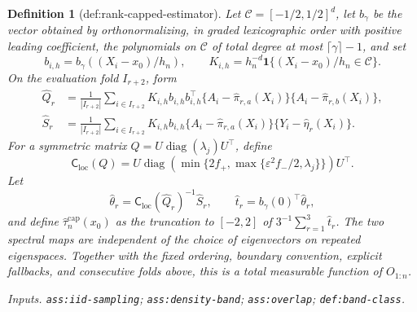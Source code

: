 \documentclass{article}
\newtheorem{definition}{Definition}
\begin{document}
\begin{definition}[def:rank-capped-estimator]
Let \(\mathcal C=[-1/2,1/2]^d\), let \(b_\gamma\) be the vector obtained by
orthonormalizing, in graded lexicographic order with positive leading
coefficient, the polynomials on \(\mathcal C\) of total degree at most
\(\lceil\gamma\rceil-1\), and set
\[
b_{i,h}=b_\gamma((X_i-x_0)/h_n),\qquad
K_{i,h}=h_n^{-d}\mathbf1\{(X_i-x_0)/h_n\in\mathcal C\}.
\]
On the evaluation fold \(I_{r+2}\), form
\[
\begin{aligned}
\widehat Q_r&=\frac1{|I_{r+2}|}\sum_{i\in I_{r+2}}
K_{i,h}b_{i,h}b_{i,h}^\top
\{A_i-\widehat\pi_{r,a}(X_i)\}
\{A_i-\widehat\pi_{r,b}(X_i)\},\\
\widehat S_r&=\frac1{|I_{r+2}|}\sum_{i\in I_{r+2}}
K_{i,h}b_{i,h}
\{A_i-\widehat\pi_{r,a}(X_i)\}
\{Y_i-\widehat\eta_r(X_i)\}.
\end{aligned}
\]
For a symmetric matrix \(Q=U\operatorname{diag}(\lambda_j)U^\top\), define
\[
\mathsf C_{\mathrm{loc}}(Q)=U\operatorname{diag}\!\left(
\min\{2f_+,\max\{\varepsilon^2f_-/2,\lambda_j\}\}
\right)U^\top.
\]
Let
\[
\widehat\theta_r=\mathsf C_{\mathrm{loc}}(\widehat Q_r)^{-1}
\widehat S_r,
\qquad
\widehat t_r=b_\gamma(0)^\top\widehat\theta_r,
\]
and define \(\widehat\tau_n^{\mathrm{cap}}(x_0)\) as the truncation to
\([-2,2]\) of \(3^{-1}\sum_{r=1}^3\widehat t_r\).  The two spectral maps
are independent of the choice of eigenvectors on repeated eigenspaces.
Together with the fixed ordering, boundary convention, explicit fallbacks,
and consecutive folds above, this is a total measurable function of
\(O_{1:n}\).
\par\smallskip\noindent\emph{Inputs.} \texttt{ass:\allowbreak{}iid-\allowbreak{}sampling}; \texttt{ass:\allowbreak{}density-\allowbreak{}band}; \texttt{ass:\allowbreak{}overlap}; \texttt{def:\allowbreak{}band-\allowbreak{}class}.
\end{definition}
\end{document}

